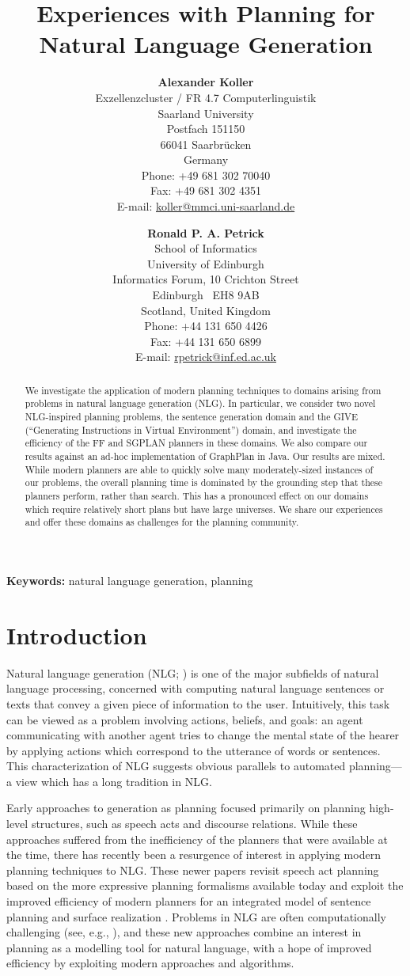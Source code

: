 \documentclass[letterpaper]{article}
\title{Experiences with Planning for Natural Language Generation}
\author{\textbf{Alexander Koller} \\
Exzellenzcluster / FR 4.7 Computerlinguistik \\
Saarland University \\
Postfach 151150 \\
66041 Saarbrücken \\
Germany \\
Phone: +49 681 302 70040 \\
Fax: +49 681 302 4351 \\
E-mail: \url{koller@mmci.uni-saarland.de}
\and
\textbf{Ronald P. A. Petrick} \\
School of Informatics \\
University of Edinburgh \\
Informatics Forum, 10 Crichton Street \\
Edinburgh \ EH8 9AB \\
Scotland, United Kingdom \\
Phone: +44 131 650 4426 \\
Fax: +44 131 650 6899 \\
E-mail: \url{rpetrick@inf.ed.ac.uk}}
\date{}
\begin{document}
\maketitle


\pagebreak
\begin{abstract}
We investigate the application of modern planning techniques to domains
arising from problems in natural language generation (NLG). In particular,
we consider two novel NLG-inspired planning problems, the sentence
generation domain and the GIVE (``Generating Instructions in Virtual
Environment'') domain, and investigate the efficiency of the FF and SGPLAN
planners in these domains. We also compare our results against an ad-hoc
implementation of GraphPlan in Java. Our results are mixed. While modern
planners are able to quickly solve many moderately-sized instances of our
problems, the overall planning time is dominated by the grounding step that
these planners perform, rather than search. This has a pronounced effect on
our domains which require relatively short plans but have large universes.
We share our experiences and offer these domains as challenges for the
planning community.
\end{abstract}

\bigskip\noindent
\textbf{Keywords:} natural language generation, planning


\pagebreak
\section{Introduction}
\label{sec:introduction}

Natural language generation (NLG; \citealp{reiter00building}) is one of the
major subfields of natural language processing, concerned with computing
natural language sentences or texts that convey a given piece of
information to the user. Intuitively, this task can be viewed as a problem
involving actions, beliefs, and goals: an agent communicating with another
agent tries to change the mental state of the hearer by applying actions
which correspond to the utterance of words or sentences.
This characterization of NLG suggests obvious parallels to automated
planning---a view which has a long tradition in NLG. 

Early approaches to generation as planning
\citep{perrault80,appelt:planning,hovy88,young94dpocl} focused primarily on
planning high-level structures, such as speech acts and discourse
relations.  While these approaches suffered from the inefficiency of the
planners that were available at the time, there has recently been a
resurgence of interest in applying modern planning techniques to NLG.
These newer papers revisit speech act planning based on the more expressive
planning formalisms available today \citep{Steedman-Petrick:07,benotti08b}
and exploit the improved efficiency of modern planners for an integrated
model of sentence planning and surface realization \citep{KolSto07}.
Problems in NLG are often computationally challenging (see, e.g.,
\citep{KolStr02}), and these new approaches combine an interest in planning
as a modelling tool for natural language, with a hope of improved
efficiency by exploiting modern approaches and algorithms.
\end{document}
